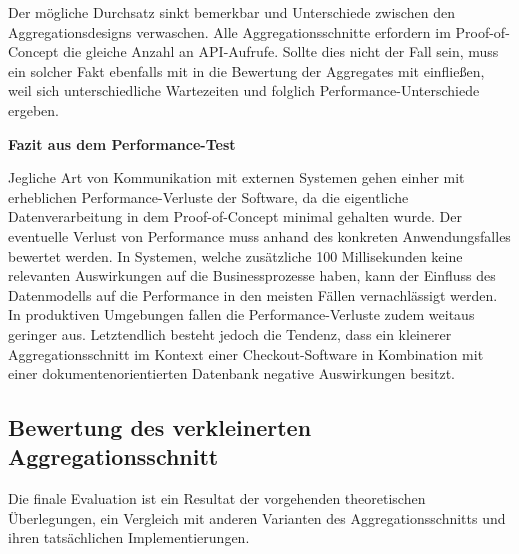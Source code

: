 Der mögliche Durchsatz sinkt bemerkbar und Unterschiede zwischen den Aggregationsdesigns verwaschen. Alle Aggregationsschnitte erfordern im Proof-of-Concept die gleiche Anzahl an API-Aufrufe. Sollte dies nicht der Fall sein, muss ein solcher Fakt ebenfalls mit in die Bewertung der Aggregates mit einfließen, weil sich unterschiedliche Wartezeiten und folglich Performance-Unterschiede ergeben. 


\textbf{Fazit aus dem Performance-Test}

Jegliche Art von Kommunikation mit externen Systemen gehen einher mit erheblichen Performance-Verluste der Software, da die eigentliche Datenverarbeitung in dem Proof-of-Concept minimal gehalten wurde. Der eventuelle Verlust von Performance muss anhand des konkreten Anwendungsfalles bewertet werden. In Systemen, welche zusätzliche 100 Millisekunden keine relevanten Auswirkungen auf die Businessprozesse haben, kann der Einfluss des Datenmodells auf die Performance in den meisten Fällen vernachlässigt werden. In produktiven Umgebungen fallen die Performance-Verluste zudem weitaus geringer aus. Letztendlich besteht jedoch die Tendenz, dass ein kleinerer Aggregationsschnitt im Kontext einer Checkout-Software in Kombination mit einer dokumentenorientierten Datenbank negative Auswirkungen besitzt.

\subsection{Bewertung des verkleinerten Aggregationsschnitt}

Die finale Evaluation ist ein Resultat der vorgehenden theoretischen Überlegungen, ein Vergleich mit anderen Varianten des Aggregationsschnitts und ihren tatsächlichen Implementierungen.


